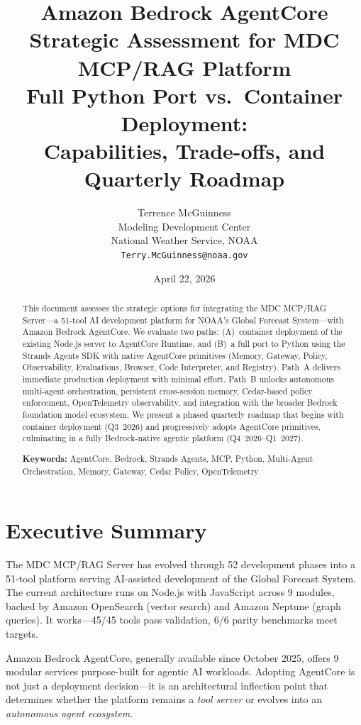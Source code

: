\documentclass[11pt,letterpaper]{article}
\title{\textbf{Amazon Bedrock AgentCore} \\
       \textbf{Strategic Assessment for MDC MCP/RAG Platform} \\[0.5em]
       \large Full Python Port vs.\ Container Deployment: \\
       \large Capabilities, Trade-offs, and Quarterly Roadmap}
\author{
    Terrence McGuinness \\
    Modeling Development Center \\
    National Weather Service, NOAA \\
    \texttt{Terry.McGuinness@noaa.gov}
}
\date{April 22, 2026}
\begin{document}
\maketitle

\begin{abstract}
This document assesses the strategic options for integrating the MDC
MCP/RAG Server---a 51-tool AI development platform for NOAA's Global
Forecast System---with Amazon Bedrock AgentCore. We evaluate two paths:
(A)~container deployment of the existing Node.js server to AgentCore
Runtime, and (B)~a full port to Python using the Strands Agents SDK
with native AgentCore primitives (Memory, Gateway, Policy, Observability,
Evaluations, Browser, Code Interpreter, and Registry). Path~A delivers
immediate production deployment with minimal effort. Path~B unlocks
autonomous multi-agent orchestration, persistent cross-session memory,
Cedar-based policy enforcement, OpenTelemetry observability, and
integration with the broader Bedrock foundation model ecosystem. We
present a phased quarterly roadmap that begins with container deployment
(Q3~2026) and progressively adopts AgentCore primitives, culminating in
a fully Bedrock-native agentic platform (Q4~2026--Q1~2027).

\textbf{Keywords:} AgentCore, Bedrock, Strands Agents, MCP, Python,
Multi-Agent Orchestration, Memory, Gateway, Cedar Policy, OpenTelemetry
\end{abstract}

\tableofcontents
\newpage

\section{Executive Summary}

The MDC MCP/RAG Server has evolved through 52 development phases into a
51-tool platform serving AI-assisted development of the Global Forecast
System. The current architecture runs on Node.js with JavaScript across
9 modules, backed by Amazon OpenSearch (vector search) and Amazon Neptune
(graph queries). It works---45/45 tools pass validation, 6/6 parity
benchmarks meet targets.

Amazon Bedrock AgentCore, generally available since October 2025, offers
9 modular services purpose-built for agentic AI workloads. Adopting
AgentCore is not just a deployment decision---it is an architectural
inflection point that determines whether the platform remains a
\textit{tool server} or evolves into an \textit{autonomous agent
ecosystem}.
\end{document}
